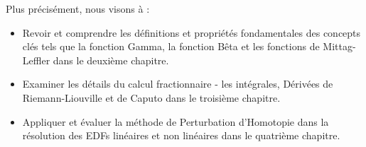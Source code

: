Plus précisément, nous visons à :
\begin{itemize}
    \item Revoir et comprendre les définitions et propriétés fondamentales des concepts clés tels que la fonction Gamma, la fonction Bêta et les fonctions de Mittag-Leffler dans le deuxième chapitre.
    \item Examiner les détails du calcul fractionnaire - les intégrales, Dérivées de Riemann-Liouville et de Caputo dans le troisième chapitre.
    \item Appliquer et évaluer la méthode de Perturbation d'Homotopie dans la résolution des EDFs linéaires et non linéaires dans le quatrième chapitre.
\end{itemize}